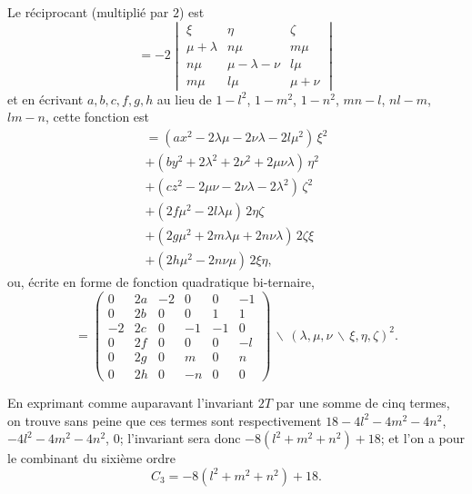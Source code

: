 \documentclass[11pt,a4paper]{book}
\begin{document}
Le r\'{e}ciprocant (multipli\'{e} par $2$) est
\[=-2\begin{vmatrix}\xi & \eta & \zeta \\ \mu+\lambda & n\mu & m\mu \\ n\mu & \mu-\lambda-\nu & l\mu \\ m\mu & l\mu & \mu+\nu\end{vmatrix}\]
et en \'{e}crivant $a,b,c,f,g,h$ au lieu de $1-l^{2}$, $1-m^{2}$, $1-n^{2}$, $mn-l$, $nl-m$,
$lm-n$, cette fonction est
\begin{multline*}
= (ax^{2} - 2\lambda\mu - 2\nu\lambda - 2l\mu^{2})\,\xi^{2} \\
+ (by^{2} + 2\lambda^{2} + 2\nu^{2} + 2\mu\nu\lambda)\,\eta^{2} \\
+ (cz^{2} - 2\mu\nu - 2\nu\lambda - 2\lambda^{2})\,\zeta^{2} \\
+ (2f\mu^{2} - 2l\lambda\mu)\,2\eta\zeta \\
+ (2g\mu^{2} + 2m\lambda\mu + 2n\nu\lambda)\,2\zeta\xi \\
+ (2h\mu^{2} - 2n\nu\mu)\,2\xi\eta,
\end{multline*}
ou, \'{e}crite en forme de fonction quadratique bi-ternaire,
\[
= \begin{pmatrix}
0 & 2a & -2 & 0 & 0 & -1 \\
0 & 2b & 0 & 0 & 1 & 1 \\
-2 & 2c & 0 & -1 & -1 & 0 \\
0 & 2f & 0 & 0 & 0 & -l \\
0 & 2g & 0 & m & 0 & n \\
0 & 2h & 0 & -n & 0 & 0
\end{pmatrix}\!\!\,\backslash\!\!\,(\lambda,\mu,\nu\,\backslash\!\!\,\xi,\eta,\zeta)^{2}.
\]

\newpage

En exprimant comme auparavant l'invariant $2T$ par une somme de cinq termes, on trouve
sans peine que ces termes sont respectivement $18-4l^{2}-4m^{2}-4n^{2}$,
$-4l^{2}-4m^{2}-4n^{2}$, $0$; l'invariant sera donc $-8(l^{2}+m^{2}+n^{2})+18$;
et l'on a pour le combinant du sixi\`{e}me ordre
\[C_{3} = -8(l^{2}+m^{2}+n^{2})+18.\]
\end{document}
